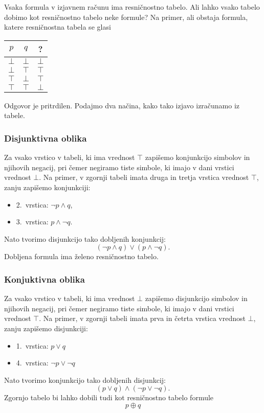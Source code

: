 Vsaka formula v izjavnem računu ima resničnostno tabelo. Ali lahko vsako tabelo
dobimo kot resničnostno tabelo neke formule? Na primer, ali obstaja formula,
katere resničnostna tabela se glasi
%
\begin{center}
  \begin{tabular}{ccc}
    \toprule
    $p$ & $q$ & ? \\ \midrule
    $\bot$ & $\bot$ & $\bot$ \\
    $\bot$ & $\top$ & $\top$ \\
    $\top$ & $\bot$ & $\top$ \\
    $\top$ & $\top$ & $\bot$ \\
    \bottomrule
  \end{tabular}
\end{center}
%
Odgovor je pritrdilen. Podajmo dva načina, kako tako izjavo izračunamo iz tabele.

\subsubsection{Disjunktivna oblika}
\label{sec:disjunktivna-oblika}

Za vsako vrstico v tabeli, ki ima vrednost $\top$ zapišemo konjunkcijo simbolov in
njihovih negacij, pri čemer negiramo tiste simbole, ki imajo v dani vrstici vrednost
$\bot$. Na primer, v zgornji tabeli imata druga in tretja vrstica vrednost $\top$, zanju
zapišemo konjunkciji:
%
\begin{itemize}
\item 2.~vrstica: $\neg p \land q$,
\item 3.~vrstica: $p \land \neg q$.
\end{itemize}
%
Nato tvorimo disjunkcijo tako dobljenih konjunkcij:
%
\begin{equation*}
  (\neg p \land q) \lor (p \land \neg q).
\end{equation*}
%
Dobljena formula ima želeno resničnostno tabelo.

\subsubsection{Konjuktivna oblika}
\label{sec:konjuktivna-oblika}

Za vsako vrstico v tabeli, ki ima vrednost $\bot$ zapišemo
disjunkcijo simbolov in njihovih negacij, pri čemer negiramo tiste simbole, ki
imajo v dani vrstici vrednost $\top$. Na primer, v zgornji tabeli imata prva in
četrta vrstica vrednost $\bot$, zanju zapišemo disjunkciji:
%
\begin{itemize}
\item 1.~vrstica: $p \lor q$
\item 4.~vrstica: $\neg p \lor \neg q$
\end{itemize}
%
Nato tvorimo konjunkcijo tako dobljenih disjunkcij:
%
\begin{equation*}
  (p \lor q) \land (\neg p \lor \neg q).
\end{equation*}
%
Zgornjo tabelo bi lahko dobili tudi kot resničnostno tabelo formule
%
\begin{equation*}
    p \oplus q
\end{equation*}

